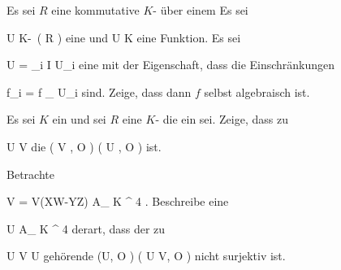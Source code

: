 {}
{





Es sei $R$ eine kommutative
$K$-
über einem
Es sei

\mavergleichskette
{\vergleichskette
{ U
}
{ \subseteq }{ K\!-\!\, \left(  R  \right)
}
{  }{
}
{    }{
}
{   }{
}
}
{}{}{}
eine
und
 { U } { K
} {}
eine Funktion. Es sei

\mavergleichskette
{\vergleichskette
{ U
}
{ = }{ \bigcup_{i \in I} U_i
}
{  }{
}
{    }{
}
{   }{
}
}
{}{}{}
eine
mit der Eigenschaft, dass die Einschränkungen

\mavergleichskette
{\vergleichskette
{ f_i
}
{ = }{ f \!\mid_{ U_i }
}
{  }{
}
{    }{
}
{   }{}
}
{}{}{}
sind. Zeige, dass dann $f$ selbst algebraisch ist.





}
{} {}

{}
{





Es sei $K$ ein
und sei $R$ eine
$K$-
die ein
sei. Zeige, dass zu

\mavergleichskette
{\vergleichskette
{U
}
{ \subseteq }{V
}
{  }{
}
{    }{
}
{   }{
}
}
{}{}{}
die
\maabbdisp {} { \Gamma ( V , {\mathcal O} ) } { \Gamma ( U , {\mathcal O} )
} {}
ist.





}
{} {}

{}
{





Betrachte

\mavergleichskette
{\vergleichskette
{V
}
{ = }{ V(XW-YZ)
}
{ \subseteq }{ { {\mathbb A}_{ K }^{  4   } }
}
{    }{
}
{   }{
}
}
{}{}{.}
Beschreibe eine

\mavergleichskette
{\vergleichskette
{ U
}
{ \subseteq }{ { {\mathbb A}_{ K }^{  4   } }
}
{  }{
}
{    }{
}
{   }{
}
}
{}{}{}
derart, dass der zu

\mavergleichskette
{\vergleichskette
{ U \cap V
}
{ \subseteq }{ U
}
{  }{
}
{    }{
}
{   }{
}
}
{}{}{}
gehörende
\maabbdisp {} { \Gamma (U, {\mathcal O} ) } { \Gamma ( U \cap V, {\mathcal O} )
} {}
nicht surjektiv ist.





}
{} {}

